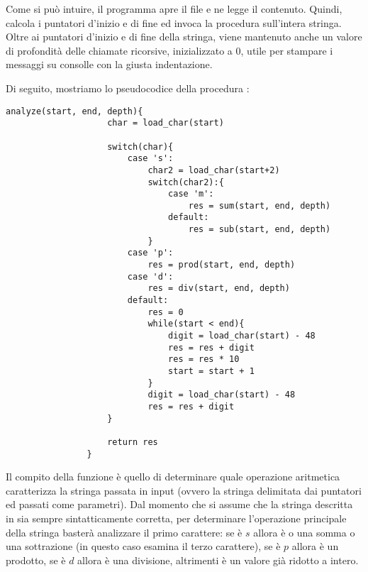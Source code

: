         Come si può intuire, il programma apre il file  e ne legge il contenuto. Quindi, calcola i puntatori d'inizio e di fine ed invoca la procedura  sull'intera stringa. Oltre ai puntatori d'inizio e di fine della stringa, viene mantenuto anche un valore di profondità delle chiamate ricorsive, inizializzato a $0$, utile per stampare i messaggi su consolle con la giusta indentazione.
        
        Di seguito, mostriamo lo pseudocodice della procedura :
		
        \begin{center}
           	\begin{lstlisting}[language=pseudo, gobble=14]
                analyze(start, end, depth){
                    char = load_char(start)
    	           	
                    switch(char){
                        case 's':
                            char2 = load_char(start+2)
                            switch(char2):{
                                case 'm':
                                    res = sum(start, end, depth)
                                default:
                                    res = sub(start, end, depth)
                            }
                        case 'p':
                            res = prod(start, end, depth)
                        case 'd':
                            res = div(start, end, depth)
                        default:
                            res = 0
                            while(start < end){
                                digit = load_char(start) - 48
                                res = res + digit
                                res = res * 10
                                start = start + 1
                            }
                            digit = load_char(start) - 48
                            res = res + digit
                    }
                    
                    return res
                }\end{lstlisting}
        \end{center}
        
        Il compito della funzione  è quello di determinare quale operazione aritmetica caratterizza la stringa passata in input (ovvero la stringa delimitata dai puntatori  ed  passati come parametri). Dal momento che si assume che la stringa descritta in  sia sempre sintatticamente corretta, per determinare l'operazione principale della stringa basterà analizzare il primo carattere: se è $s$ allora è o una somma o una sottrazione (in questo caso esamina il terzo carattere), se è $p$ allora è un prodotto, se è $d$ allora è una divisione, altrimenti è un valore già ridotto a intero.
        
